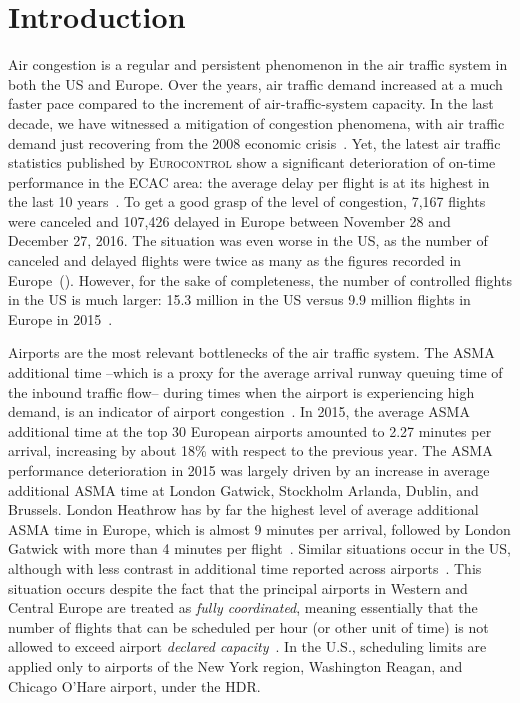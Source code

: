 \documentclass[final,review]{elsarticle}
\begin{document}

\section{Introduction}
\label{sec:introduction}

Air congestion is a regular and persistent phenomenon in the air traffic system in both the US and Europe.
Over the years, air traffic demand increased at a much faster pace compared to the increment of air-traffic-system capacity.
In the last decade, we have witnessed a mitigation of congestion phenomena, with air traffic demand just recovering from the 2008 economic crisis~\citep[\S{}1.2]{prr2017}. Yet, the latest air traffic statistics published by \textsc{Eurocontrol} show a significant deterioration of on-time performance in the \acl{ECAC} area: the average delay per flight is at its highest in the last 10 years~\citep{coda2016}.
To get a good grasp of the level of congestion, 7,167 flights were canceled and 107,426  delayed in Europe between November 28 and December 27, 2016.
The situation was even worse in the US, as the number of canceled and delayed flights were twice as many as the figures recorded in Europe~(\citeauthor{flightstats}).
However, for the sake of completeness, the number of controlled flights in the US is much larger: 15.3 million  in the US versus 9.9 million flights in Europe in 2015~\citep{EUCTRL-FAA2015}.

Airports are the most relevant bottlenecks of the air traffic system. The \ac{ASMA} additional time --which is a proxy for the average arrival runway queuing time of the inbound traffic flow-- during times when the airport is experiencing high demand, is an indicator of airport congestion~\citep{ASMA-def}. In 2015, the average \acs{ASMA} additional time at the top 30 European airports amounted to  2.27 minutes per arrival, increasing by about 18\% with respect to the previous year.
The \ac{ASMA} performance deterioration in 2015 was largely driven by an increase in average additional \ac{ASMA} time at London Gatwick, Stockholm Arlanda, Dublin, and Brussels.
London Heathrow has by far the highest level of average additional \ac{ASMA} time in Europe, which is almost 9 minutes per arrival, followed by London Gatwick with more than 4 minutes per flight~\citep{PRR2015}.
Similar situations occur in the US, although with less contrast in additional time reported across airports~\citep{EUCTRL-FAA2015}.
This situation occurs despite the fact that the principal airports in Western and Central Europe are treated as \emph{fully coordinated}, meaning essentially that the number of flights that can be scheduled per hour (or other unit of time) is not allowed to exceed airport \emph{declared capacity}~\citep{deNO2003}.
In the U.S., scheduling limits are applied only to airports of the New York region, Washington Reagan, and Chicago O'Hare airport, under the \acl{HDR}.
\end{document}
